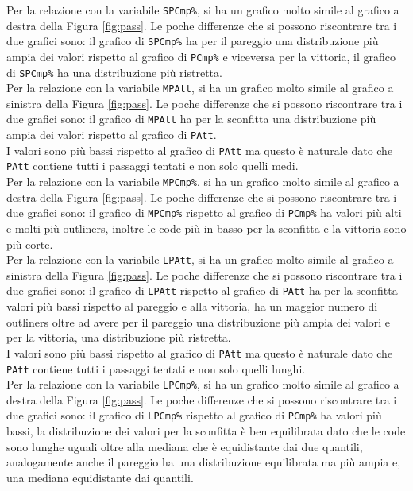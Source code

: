 Per la relazione con la variabile \texttt{SPCmp\%}, si ha un grafico molto simile al grafico a destra della Figura \ref{fig:pass}. Le poche differenze che si possono riscontrare tra i due grafici sono: il grafico di \texttt{SPCmp\%} ha per il pareggio una distribuzione più ampia dei valori rispetto al grafico di \texttt{PCmp\%} e viceversa per la vittoria, il grafico di \texttt{SPCmp\%} ha una distribuzione più ristretta.\\

Per la relazione con la variabile \texttt{MPAtt}, si ha un grafico molto simile al grafico a sinistra della Figura \ref{fig:pass}. Le poche differenze che si possono riscontrare tra i due grafici sono: il grafico di \texttt{MPAtt} ha per la sconfitta una distribuzione più ampia dei valori rispetto al grafico di \texttt{PAtt}.\\
I valori sono più bassi rispetto al grafico di \texttt{PAtt} ma questo è naturale dato che \texttt{PAtt} contiene tutti i passaggi tentati e non solo quelli medi.\\

Per la relazione con la variabile \texttt{MPCmp\%}, si ha un grafico molto simile al grafico a destra della Figura \ref{fig:pass}. Le poche differenze che si possono riscontrare tra i due grafici sono: il grafico di \texttt{MPCmp\%} rispetto al grafico di \texttt{PCmp\%} ha valori più alti e molti più outliners, inoltre le code più in basso per la sconfitta e la vittoria sono più corte.\\

Per la relazione con la variabile \texttt{LPAtt}, si ha un grafico molto simile al grafico a sinistra della Figura \ref{fig:pass}. Le poche differenze che si possono riscontrare tra i due grafici sono: il grafico di \texttt{LPAtt} rispetto al grafico di \texttt{PAtt} ha per la sconfitta valori più bassi rispetto al pareggio e alla vittoria, ha un maggior numero di outliners oltre ad avere per il pareggio una distribuzione più ampia dei valori e per la vittoria, una distribuzione più ristretta.\\
I valori sono più bassi rispetto al grafico di \texttt{PAtt} ma questo è naturale dato che \texttt{PAtt} contiene tutti i passaggi tentati e non solo quelli lunghi.\\

Per la relazione con la variabile \texttt{LPCmp\%}, si ha un grafico molto simile al grafico a destra della Figura \ref{fig:pass}. Le poche differenze che si possono riscontrare tra i due grafici sono: il grafico di \texttt{LPCmp\%} rispetto al grafico di \texttt{PCmp\%} ha valori più bassi, la distribuzione dei valori per la sconfitta è ben equilibrata dato che le code sono lunghe uguali oltre alla mediana che è equidistante dai due quantili, analogamente anche il pareggio ha una distribuzione equilibrata ma più ampia e, una mediana equidistante dai quantili.\\

